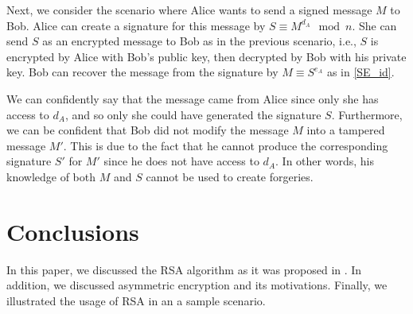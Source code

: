 \documentclass[10pt]{article}
\begin{document}
Next, we consider the scenario where Alice wants to send a signed message $M$ to Bob. Alice can create a signature for this message by $S \equiv M^{d_A} \mod n$. She can send $S$ as an encrypted message to Bob as in the previous scenario, i.e., $S$ is encrypted by Alice with Bob's public key, then decrypted by Bob with his private key. Bob can recover the message from the signature by $M \equiv S^{e_A}$ as in \ref{SE_id}. 

We can confidently say that the message came from Alice since only she has access to $d_A$, and so only she could have generated the signature $S$. Furthermore, we can be confident that Bob did not modify the message $M$ into a tampered message $M'$. This is due to the fact that he cannot produce the corresponding signature $S'$ for $M'$ since he does not have access to $d_A$. In other words, his knowledge of both $M$ and $S$ cannot be used to create forgeries.


\section{Conclusions}
In this paper, we discussed the RSA algorithm as it was proposed in \cite{rivest1978method}. In addition, we discussed asymmetric encryption and its motivations. Finally, we illustrated the usage of RSA in an a sample scenario.



\end{document}
